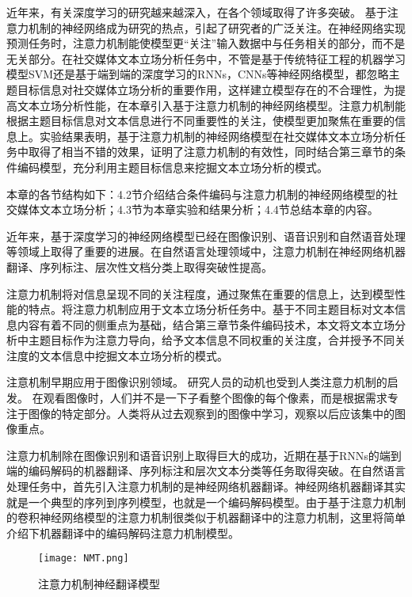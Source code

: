 

近年来，有关深度学习的研究越来越深入，在各个领域取得了许多突破。 基于注意力机制的神经网络成为研究的热点，引起了研究者的广泛关注。在神经网络实现预测任务时，注意力机制能使模型更“关注”输入数据中与任务相关的部分，而不是无关部分。在社交媒体文本立场分析任务中，不管是基于传统特征工程的机器学习模型SVM还是基于端到端的深度学习的RNNs，CNNs等神经网络模型，都忽略主题目标信息对社交媒体立场分析的重要作用，这样建立模型存在的不合理性，为提高文本立场分析性能，在本章引入基于注意力机制的神经网络模型。注意力机制能根据主题目标信息对文本信息进行不同重要性的关注，使模型更加聚焦在重要的信息上。实验结果表明，基于注意力机制的神经网络模型在社交媒体文本立场分析任务中取得了相当不错的效果，证明了注意力机制的有效性，同时结合第三章节的条件编码模型，充分利用主题目标信息来挖掘文本立场分析的模式。

本章的各节结构如下：4.2节介绍结合条件编码与注意力机制的神经网络模型的社交媒体文本立场分析；4.3节为本章实验和结果分析；4.4节总结本章的内容。


近年来，基于深度学习的神经网络模型已经在图像识别、语音识别和自然语音处理等领域上取得了重要的进展。在自然语言处理领域中，注意力机制在神经网络机器翻译、序列标注、层次性文档分类上取得突破性提高。

注意力机制将对信息呈现不同的关注程度，通过聚焦在重要的信息上，达到模型性能的特点。将注意力机制应用于文本立场分析任务中。基于不同主题目标对文本信息内容有着不同的侧重点为基础，结合第三章节条件编码技术，本文将文本立场分析中主题目标作为注意力导向，给予文本信息不同权重的关注度，合并授予不同关注度的文本信息中挖掘文本立场分析的模式。


注意机制早期应用于图像识别领域。 研究人员的动机也受到人类注意力机制的启发。 在观看图像时，人们并不是一下子看整个图像的每个像素，而是根据需求专注于图像的特定部分。人类将从过去观察到的图像中学习，观察以后应该集中的图像重点。

注意力机制除在图像识别和语音识别上取得巨大的成功，近期在基于RNNs的端到端的编码解码的机器翻译、序列标注和层次文本分类等任务取得突破。在自然语言处理任务中，首先引入注意力机制的是神经网络机器翻译。神经网络机器翻译其实就是一个典型的序列到序列模型，也就是一个编码解码模型﻿。由于基于注意力机制的卷积神经网络模型的注意力机制很类似于机器翻译中的注意力机制，这里将简单介绍下机器翻译中的编码解码注意力机制模型。
\begin{figure}[htbp]
	\centering
	\texttt{[image: NMT.png]}
	\caption[rnn_vanish]{注意力机制神经翻译模型}
\end{figure}

